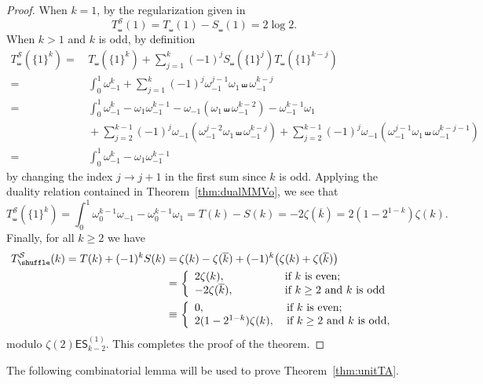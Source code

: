 \documentclass{article}
\newcommand{\ES}{\mathsf {ES}}
\newcommand{\sha}{\shuffle}
\newcommand{\Sy}{{\mathcal S}}
\newcommand\om{{\omega}}
\newcommand{\ol}{\overline}
\theoremstyle{plain}
\theoremstyle{definition}
\begin{document}
\begin{proof}
When $k=1$, by the regularization given in \cite[Prop. 2.8]{XuZhao2020a}
\begin{equation*}
T_\sha^\Sy(1)= T_\sha(1)-S_\sha(1)=2\log 2.
\end{equation*}
When $k>1$ and $k$ is odd, by definition
\begin{align*}
 T_\sha^\Sy(\{1\}^k)=&\, T_\sha(\{1\}^k)+ \sum_{j=1}^k  (-1)^j S_\sha(\{1\}^j)T_\sha(\{1\}^{k-j})\\
=&\,\int_0^1 \om_{-1}^k+ \sum_{j=1}^k  (-1)^j \om_{-1}^{j-1} \om_1 \sha \om_{-1}^{k-j}\\
=&\, \int_0^1 \om_{-1}^k-\om_1\om_{-1}^{k-1}- \om_{-1}( \om_1 \sha \om_{-1}^{k-2})-\om_{-1}^{k-1} \om_1 \\
&\, +\sum_{j=2}^{k-1}  (-1)^j \om_{-1} (\om_{-1}^{j-2}\om_1 \sha \om_{-1}^{k-j})
+ \sum_{j=2}^{k-1} (-1)^j\om_{-1} (\om_{-1}^{j-1}\om_1 \sha \om_{-1}^{k-j-1})  \\
=&\, \int_0^1  \om_{-1}^k-\om_1\om_{-1}^{k-1}
\end{align*}
by changing the index $j\to j+1$ in the first sum since $k$ is odd. Applying the duality relation contained in Theorem~\ref{thm:dualMMVo}, we see that
\begin{equation*}
  T_\sha^\Sy(\{1\}^k)=\int_0^1  \om_0^{k-1}\om_{-1}-\om_0^{k-1}\om_1
  = T(k)-S(k)=-2 \zeta(\ol{k})=2(1-2^{1-k})\zeta(k).
\end{equation*}
Finally, for all $k\ge 2$ we have
\begin{align} \label{equ:SMTdp1}
    T_\sha^\Sy(k) = T(k)+(-1)^k S(k)=&\, \zeta(k)-\zeta(\ol{k})+(-1)^k\big(\zeta(k)+\zeta(\ol{k}) \big) \\
    =&\, \left\{
  \begin{array}{ll}
    2\zeta(k), \hskip1.5cm\ & \hbox{if $k$ is even;}\\
    -2 \zeta(\ol{k}),  & \hbox{if $k\ge 2$ and $k$ is odd}
  \end{array}
\right.         \notag   \\
    \equiv &\, \left\{
  \begin{array}{ll}
      0, \phantom{\zeta(k)} \hskip1.5cm\ & \hbox{if $k$ is even;}\\
     2(1-2^{1-k}) \zeta(k), & \hbox{if $k\ge 2$ and $k$ is odd,}
  \end{array}
\right. \notag
\end{align}
modulo $\zeta(2)\ES_{k-2}^{(1)}$. This completes the proof of the theorem.
\end{proof}

The following combinatorial lemma will be used to prove Theorem~\ref{thm:unitTA}.
\end{document}
